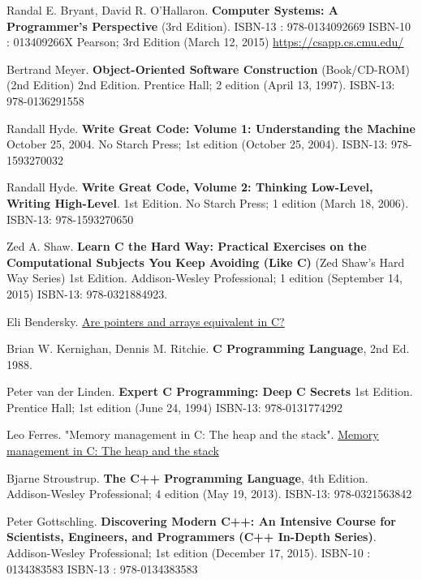 \documentclass[10pt]{amsart}
\begin{document}
\begin{thebibliography}{9}

Randal E. Bryant, David R. O'Hallaron. \textbf{Computer Systems: A Programmer's Perspective} (3rd Edition). ISBN-13 : 978-0134092669
ISBN-10 : 013409266X
 Pearson; 3rd Edition (March 12, 2015) 
\url{https://csapp.cs.cmu.edu/}


Bertrand Meyer. \textbf{Object-Oriented Software Construction} (Book/CD-ROM) (2nd Edition) 2nd Edition.   Prentice Hall; 2 edition (April 13, 1997).  ISBN-13: 978-0136291558

Randall Hyde.  \textbf{Write Great Code: Volume 1: Understanding the Machine} October 25, 2004.  No Starch Press; 1st edition (October 25, 2004).  ISBN-13: 978-1593270032

Randall Hyde.  \textbf{Write Great Code, Volume 2: Thinking Low-Level, Writing High-Level}.   1st Edition.  No Starch Press; 1 edition (March 18, 2006).  ISBN-13: 978-1593270650

Zed A. Shaw.  \textbf{Learn C the Hard Way: Practical Exercises on the Computational Subjects You Keep Avoiding (Like C)} (Zed Shaw's Hard Way Series) 1st Edition.  Addison-Wesley Professional; 1 edition (September 14, 2015) ISBN-13: 978-0321884923.  

Eli Bendersky.   \href{https://eli.thegreenplace.net/2009/10/21/are-pointers-and-arrays-equivalent-in-c}{Are pointers and arrays equivalent in C?}

Brian W. Kernighan, Dennis M. Ritchie.  \textbf{C Programming Language}, 2nd Ed. 1988.   

Peter van der Linden.  \textbf{Expert C Programming: Deep C Secrets} 1st Edition.  Prentice Hall; 1st edition (June 24, 1994)  ISBN-13: 978-0131774292

Leo Ferres.  "Memory management in C: The heap and the stack".  \href{http://www.inf.udec.cl/~leo/teoX.pdf}{Memory management in C: The heap and the stack}




Bjarne Stroustrup.  \textbf{The C++ Programming Language}, 4th Edition. Addison-Wesley Professional; 4 edition (May 19, 2013).  ISBN-13: 978-0321563842

Peter Gottschling. \textbf{Discovering Modern C++: An Intensive Course for Scientists, Engineers, and Programmers (C++ In-Depth Series)}. Addison-Wesley Professional; 1st edition (December 17, 2015). ISBN-10 : 0134383583
ISBN-13 : 978-0134383583 



\end{thebibliography}
\end{document}
